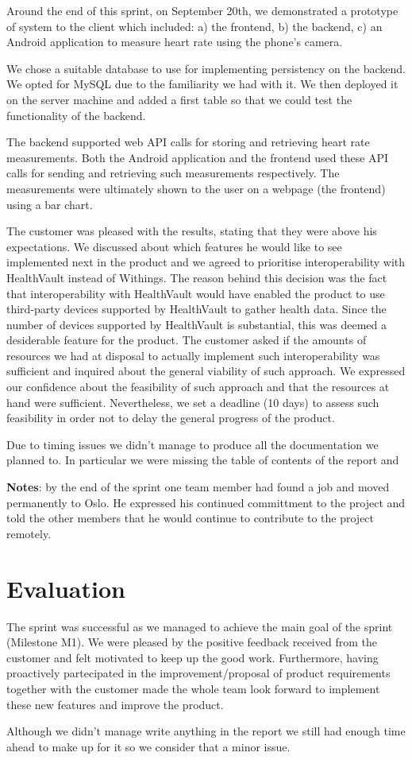 Around the end of this sprint, on September 20th, we demonstrated a prototype of system to
the client which included: a) the frontend, b) the backend, c) an Android application to measure
heart rate using the phone's camera.



We chose a suitable database to use for implementing persistency on the backend.
We opted for MySQL due to the familiarity we had with it.
We then deployed it on the server machine and added a first table
so that we could test the functionality of the backend.


The backend supported web API calls for storing and retrieving heart rate measurements.
Both the Android application and the frontend used these API calls for sending and retrieving
such measurements respectively. The measurements were ultimately shown to the user on a
webpage (the frontend) using a bar chart.

The customer was pleased with the results, stating that they were above his expectations.
We discussed about which features he would like to see implemented next in the product
and we agreed to prioritise interoperability with HealthVault instead of Withings.
The reason behind this decision was the fact that interoperability with HealthVault would have
enabled the product to use third-party devices supported by HealthVault to gather health data.
Since the number of devices supported by HealthVault is substantial, this was deemed a
desiderable feature for the product.
The customer asked if the amounts of resources we had at disposal to actually implement
such interoperability was sufficient and inquired about the general viability of such approach.
We expressed our confidence about the feasibility of such approach and that the resources
at hand were sufficient. Nevertheless, we set a deadline (10 days) to assess such
feasibility in order not to delay the general progress of the product.

Due to timing issues we didn't manage to produce all the documentation we planned to.
In particular we were missing the table of contents of the report and 

\textbf{Notes}: by the end of the sprint one team member had found a job and moved permanently to Oslo.
He expressed his continued committment to the project and told the other members that he would continue
to contribute to the project remotely.

\section{Evaluation}

The sprint was successful as we managed to achieve the main goal of the sprint (Milestone M1).
We were pleased by the positive feedback received from the customer and felt motivated to
keep up the good work. Furthermore, having proactively partecipated in the improvement/proposal
of product requirements together with the customer made the whole team look forward to implement these new features and improve the product.

Although we didn't manage write anything in the report we still had enough time ahead to
make up for it so we consider that a minor issue.
